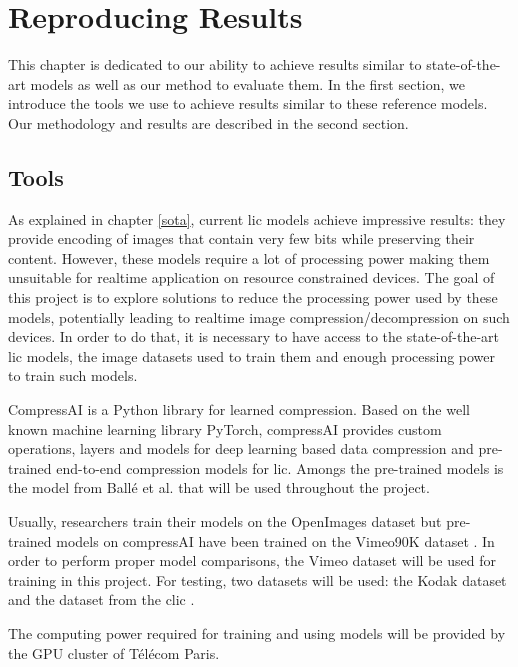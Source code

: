 \chapter{Reproducing Results}
\label{part_1}
This chapter is dedicated to our ability to achieve results similar to state-of-the-art models as well as our method to evaluate them. In the first section, we introduce the tools we use to achieve results similar to these reference models. Our methodology and results are described in the second section.

\section{Tools}
As explained in chapter \ref{sota}, current \acrshort{lic} models achieve impressive results: they provide encoding of images that contain very few bits while preserving their content. However, these models require a lot of processing power making them unsuitable for realtime application on resource constrained devices. The goal of this project is to explore solutions to reduce the processing power used by these models, potentially leading to realtime image compression/decompression on such devices. In order to do that, it is necessary to have access to the state-of-the-art \acrshort{lic} models, the image datasets used to train them and enough processing power to train such models.

CompressAI \cite{compressai} is a Python library for learned compression. Based on the well known machine learning library PyTorch, compressAI provides custom operations, layers and models for deep learning based data compression and pre-trained end-to-end compression models for \acrshort{lic}. Amongs the pre-trained models is the model from Ballé et al. \cite{ballé2018variationalimagecompressionscale} that will be used throughout the project.

Usually, researchers train their models on the OpenImages dataset \cite{openimages} but pre-trained models on compressAI have been trained on the Vimeo90K dataset \cite{xue2019video}. In order to perform proper model comparisons, the Vimeo dataset will be used for training in this project. For testing, two datasets will be used: the Kodak dataset \cite{kodak} and the dataset from the \acrfull{clic} \cite{clic}.

The computing power required for training and using models will be provided by the GPU cluster of Télécom Paris.

